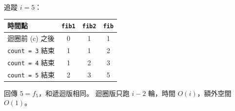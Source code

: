 \begin{pastsoln}
追蹤 $i = 5$：
\begin{center}
\begin{tabular}{lccc}
\toprule
時間點 & \texttt{fib1} & \texttt{fib2} & \texttt{fib} \\
\midrule
迴圈前 (c) 之後 & 0 & 1 & 1 \\
\texttt{count = 3} 結束 & 1 & 1 & 2 \\
\texttt{count = 4} 結束 & 1 & 2 & 3 \\
\texttt{count = 5} 結束 & 2 & 3 & 5 \\
\bottomrule
\end{tabular}
\end{center}
回傳 $5 = f_5$，和遞迴版相同。 迴圈版只跑 $i - 2$ 輪，時間 $O(i)$，額外空間 $O(1)$。
\end{pastsoln}
